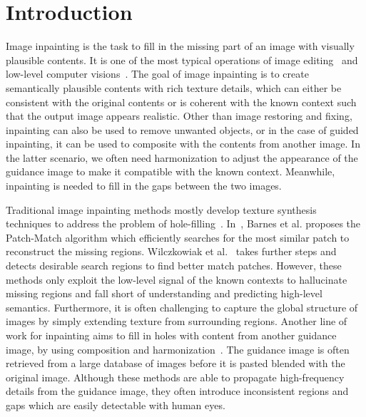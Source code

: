 \section{Introduction}
Image inpainting is the task to fill in the missing part of an image with visually plausible contents. It is one of the most typical operations of image editing~\cite{gatys2015texture} and low-level computer visions~\cite{komodakis2006image,hays2007scene}. The goal of image inpainting is to create semantically plausible contents with rich texture details, which can either be consistent with the original contents or is coherent with the known context such that the output image appears realistic. Other than image restoring and fixing, inpainting can also be used to remove unwanted objects, or in the case of guided inpainting, it can be used to composite with the contents from another image. In the latter scenario, we often need harmonization to adjust the appearance of the guidance image to make it compatible with the known context. Meanwhile, inpainting is needed to fill in the gaps between the two images.    

Traditional image inpainting methods mostly develop texture synthesis techniques to address the problem of hole-filling~\cite{bertalmio2000image,komodakis2006image,wexler2004space,barnes2009patchmatch,bertalmio2003simultaneous,wilczkowiak2005hole}. In~\cite{barnes2009patchmatch}, Barnes et al. proposes the Patch-Match algorithm which efficiently searches for the most similar patch to reconstruct the missing regions. Wilczkowiak et al.~\cite{wilczkowiak2005hole} takes further steps and detects desirable search regions to find better match patches. However, these methods only exploit the low-level signal of the known contexts to hallucinate missing regions and fall short of understanding and predicting high-level semantics. Furthermore, it is often challenging to capture the global structure of images by simply extending texture from surrounding regions. Another line of work for inpainting aims to fill in holes with content from another guidance image, by using composition and harmonization~\cite{hays2007scene,tsai2017deep}. The guidance image is often retrieved from a large database of images before it is pasted blended with the original image. Although these methods are able to propagate high-frequency details from the guidance image, they often introduce inconsistent regions and gaps which are easily detectable with human eyes.  

